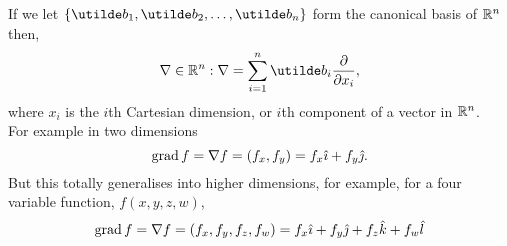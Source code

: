 \documentclass{report}
\begin{document}
If we let $\braces{\ut{b}_1, \ut{b}_2, \dots, \ut{b}_n}$ form the canonical basis of $\mathbb{R}^n$ then,
$$
	\grad \in\bbr^n: \grad = \sum_{i=1}^{n} \ut{b_i}\del{}{x_i},
$$
where $x_i$ is the $i$th Cartesian dimension, or $i$th component of a vector in $\mathbb{R}^n$. \\

For example in two dimensions
$$
	\mathop{\text{grad}} f = \nabla f = (f_x, f_y) = f_x\hat{\imath} + f_y\hat{\jmath}.
$$
But this totally generalises into higher dimensions, for example, for a four variable function, $f(x,y,z,w)$,
$$
	\mathop{\text{grad}}f = \nabla f = (f_x, f_y, f_z, f_w) = f_x\hat{\imath} + f_y\hat{\jmath} + f_z\hat{k} + f_w\hat{l}
$$

\end{document}
